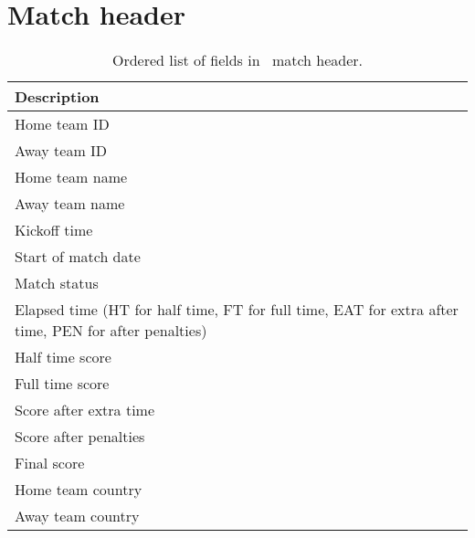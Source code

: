 \section{Match header}

\begin{table}
    \centering
    \noindent\begin{tabular}{| l |}
        \hline
        \textbf{Description} \\\hline
        Home team ID \\\hline
        Away team ID \\\hline
        Home team name \\\hline
        Away team name \\\hline
        Kickoff time \\\hline
        Start of match date \\\hline
        Match status \\\hline
        Elapsed time (HT for half time, FT for full time, EAT for extra after time, PEN for after penalties) \\\hline
        Half time score \\\hline
        Full time score \\\hline
        Score after extra time \\\hline
        Score after penalties \\\hline
        Final score \\\hline
        Home team country \\\hline
        Away team country \\\hline
    \end{tabular}
    \caption{Ordered list of fields in \whoscored\ match header.}
    \label{tab:whoscored-match-header-data}
\end{table}